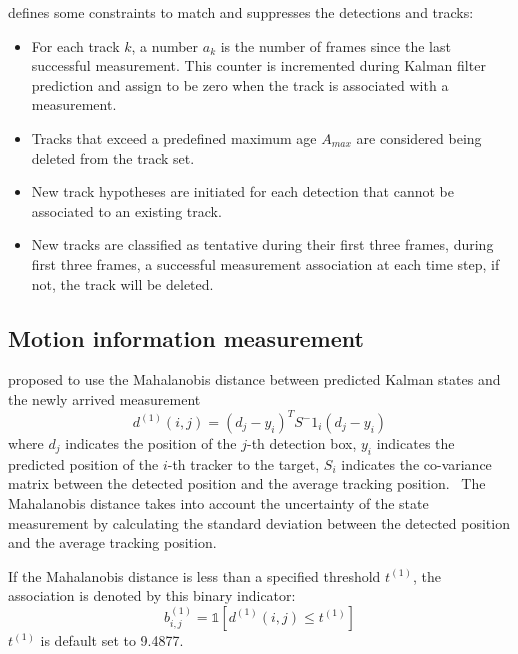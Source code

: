 \pagebreak
\cite{Wojke2017simple} defines some constraints to match and suppresses the detections and tracks:
\begin{itemize}
    \item For each track $k$, a number $a_k$ is the number of frames since the last successful measurement. This counter is incremented during Kalman filter prediction and assign to be zero when the track is associated with a measurement.
    \item Tracks that exceed a predefined maximum age $A_{max}$ are considered being deleted from the track set.
    \item New track hypotheses are initiated for each detection that cannot be associated to an existing track.
    \item New tracks are classified as tentative during their first three frames, during first three frames, a successful measurement association at each time step, if not, the track will be deleted.
\end{itemize}
\subsection{Motion information measurement}
\hspace{0.5cm} \cite{Wojke2017simple} proposed to use the Mahalanobis distance between predicted Kalman states and the newly arrived measurement
\begin{equation}
    d^{(1)}(i,j) = (d_j - y_i)^TS^-1_i(d_j-y_i)
\end{equation}
where $d_j$ indicates the position of the $j$-th detection box, $y_i$ indicates the predicted position of the $i$-th 
tracker to the target, $S_i$ indicates the co-variance matrix between the detected position and the average tracking position. \
The Mahalanobis distance takes into account the uncertainty of the state measurement by calculating the standard deviation between the detected position and the average tracking position.\par
If the Mahalanobis distance is less than a specified threshold $t^{(1)}$, the association is denoted by this binary indicator:
\begin{equation}
    b^{(1)}_{i,j}=\mathbb{1}[d^{(1)}(i,j) \leq t^{(1)}]
\end{equation}
$t^{(1)}$ is default set to 9.4877.\cite{Wojke2017simple}

